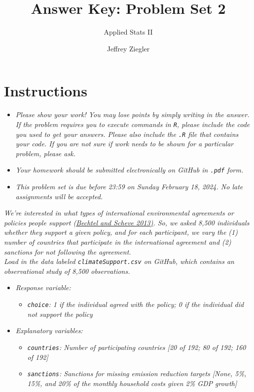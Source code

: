 \documentclass[12pt,letterpaper]{article}
\title{Answer Key: Problem Set 2}
\date{Jeffrey Ziegler}
\author{Applied Stats II}
\begin{document}
	\maketitle
	
	\section*{Instructions}
	\begin{itemize}
		\item \textit{Please show your work! You may lose points by simply writing in the answer. If the problem requires you to execute commands in \texttt{R}, please include the code you used to get your answers. Please also include the \texttt{.R} file that contains your code. If you are not sure if work needs to be shown for a particular problem, please ask.}
			\item \textit{Your homework should be submitted electronically on GitHub in \texttt{.pdf} form.}
			\item \textit{This problem set is due before 23:59 on Sunday February 18, 2024. No late assignments will be accepted.}
	\end{itemize}
	
	\vspace{.25cm}

\noindent \textit{We're interested in what types of international environmental agreements or policies people support (\href{https://www.pnas.org/content/110/34/13763}{Bechtel and Scheve 2013)}. So, we asked 8,500 individuals whether they support a given policy, and for each participant, we vary the (1) number of countries that participate in the international agreement and (2) sanctions for not following the agreement.} \\

\noindent \textit{Load in the data labeled \texttt{climateSupport.csv} on GitHub, which contains an observational study of 8,500 observations.}

\begin{itemize}
	\item \textit{
	Response variable:} 
	\begin{itemize}
		\item \textit{ \texttt{choice}: 1 if the individual agreed with the policy; 0 if the individual did not support the policy}
	\end{itemize}
	\item \textit{
	Explanatory variables: }
	\begin{itemize}
		\item \textit{
		\texttt{countries}: Number of participating countries [20 of 192; 80 of 192; 160 of 192]}
		\item \textit{
		\texttt{sanctions}: Sanctions for missing emission reduction targets [None, 5\%, 15\%, and 20\% of the monthly household costs given 2\% GDP growth]}
		
	\end{itemize}
	
\end{itemize}
\end{document}
